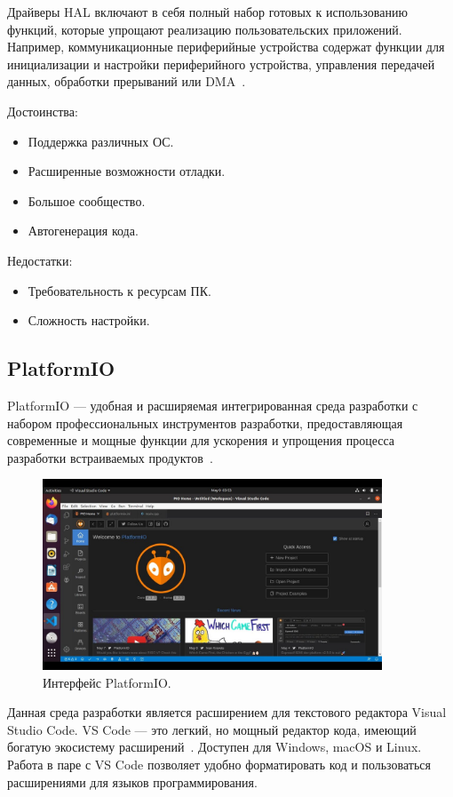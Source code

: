 	Драйверы HAL включают в себя полный набор готовых к использованию функций, которые упрощают реализацию пользовательских приложений. Например, коммуникационные периферийные устройства содержат функции для инициализации и настройки периферийного устройства, управления передачей данных, обработки прерываний или DMA~\cite{hal}.
	
	Достоинства:
	\begin{itemize}
		\item Поддержка различных ОС.
		\item Расширенные возможности отладки.
		\item Большое сообщество.
		\item Автогенерация кода.
	\end{itemize}
	
	Недостатки:
	\begin{itemize}
		\item Требовательность к ресурсам ПК.
		\item Сложность настройки.
	\end{itemize}

\subsection{PlatformIO}

	PlatformIO --- удобная и расширяемая интегрированная среда разработки с набором профессиональных инструментов разработки, предоставляющая современные и мощные функции для ускорения и упрощения процесса разработки встраиваемых продуктов~\cite{plio}.
	
	\begin{figure}[h]
    \centering
    \includegraphics[width=0.9\textwidth]{../image/plio.jpg}
    \caption{Интерфейс PlatformIO.}
	\end{figure}
	
	Данная среда разработки является расширением для текстового редактора Visual Studio Code. VS Code --- это легкий, но мощный редактор кода, имеющий богатую экосистему расширений~\cite{docsplio}. Доступен для Windows, macOS и Linux. Работа в паре с VS Code позволяет удобно форматировать код и пользоваться расширениями для языков программирования.
	
